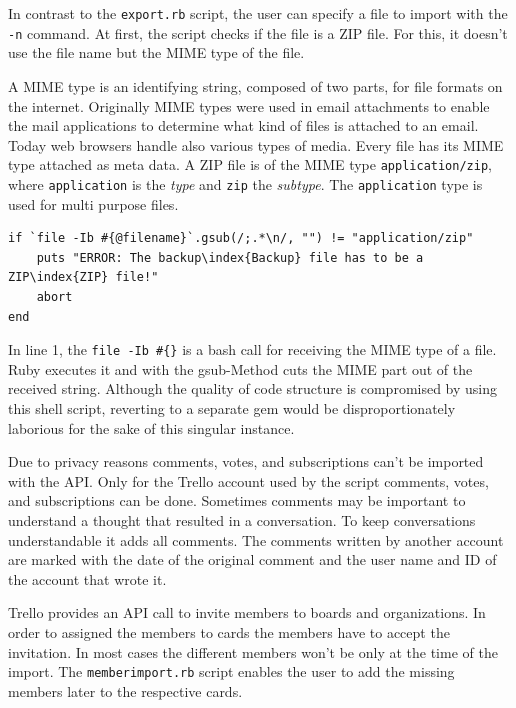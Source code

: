 In contrast to the \texttt{export.rb} script, the user can specify a file to import with the \texttt{-n} command. At first, the script checks if the file is a ZIP file. For this, it doesn't use the file name but the MIME type of the file.

A MIME type is an identifying string, composed of two parts, for file formats on the internet. Originally MIME types were used in email attachments to enable the  mail applications to determine what kind of files is attached to an email. Today web browsers handle also various types of media. Every file has its MIME type attached as meta data. A ZIP file is of the MIME type \texttt{application/zip}, where \texttt{application} is the \emph{type} and \texttt{zip} the \emph{subtype}. The \texttt{application} type is used for multi purpose files. \cite{rfc:2046}

\begin{lstlisting}[aboveskip=1\baselineskip, caption=Checking if the file has the MIME type \textquotedblleft application/zip\textquotedblright, label=listing008]
if `file -Ib #{@filename}`.gsub(/;.*\n/, "") != "application/zip"
	puts "ERROR: The backup\index{Backup} file has to be a ZIP\index{ZIP} file!"
	abort
end
\end{lstlisting}
	
In line 1, the \texttt{file -Ib \#\{\@filename\}} is a bash call for receiving the MIME type of a file. Ruby executes it and with the gsub-Method cuts the MIME part out of the received string. Although the quality of code structure is compromised by using this shell script, reverting to a separate gem would be disproportionately laborious for the sake of this singular instance. 

Due to privacy reasons comments, votes, and subscriptions can't be imported with the API. Only for the Trello account used by the script comments, votes, and subscriptions can be done. Sometimes comments may be important to understand a thought that resulted in a conversation. To keep conversations understandable it adds all comments. The comments written by another account are marked with the date of the original comment and the user name and ID of the account that wrote it. 

Trello provides an API call to invite members to boards and organizations. In order to assigned the members to cards the members have to accept the invitation. In most cases the different members won't be only at the time of the import. The \texttt{memberimport.rb} script enables the user to add the missing members later to the respective cards.

